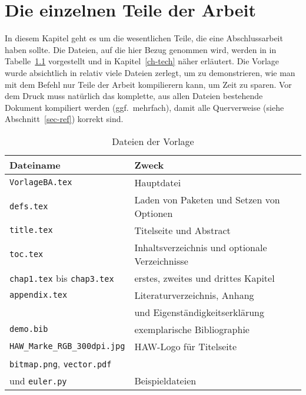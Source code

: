 \chapter{Die einzelnen Teile der Arbeit}


In diesem Kapitel geht es um die wesentlichen Teile, die eine Abschlussarbeit
haben sollte.  Die Dateien, auf die hier Bezug genommen wird, werden in in
Tabelle~\ref{tab-files} vorgestellt und in Kapitel~\ref{ch-tech} näher
erläutert.  Die Vorlage wurde absichtlich in relativ viele Dateien zerlegt,
um zu demonstrieren, wie man mit dem Befehl \verb|| nur Teile der
Arbeit kompilierern kann, um Zeit zu sparen.  Vor dem Druck muss natürlich das
komplette, aus allen Dateien bestehende Dokument kompiliert werden (ggf.\
mehrfach), damit alle Querverweise (siehe Abschnitt~\ref{sec-ref}) korrekt
sind.

\begin{table}[!ht]
  \caption{Dateien der Vorlage}
  \centering
  \begin{tabular}{ll}
    \toprule
    Dateiname & Zweck \\
    \midrule
    \texttt{VorlageBA.tex} & Hauptdatei \\
    \texttt{defs.tex} & Laden von Paketen und Setzen von Optionen \\
    \texttt{title.tex} & Titelseite und Abstract \\
    \texttt{toc.tex} & Inhaltsverzeichnis und optionale Verzeichnisse \\
    \texttt{chap1.tex} bis \texttt{chap3.tex} & erstes, zweites und drittes Kapitel \\
    \texttt{appendix.tex} & Literaturverzeichnis, Anhang \\
    & und Eigenständigkeitserklärung \\
    \texttt{demo.bib} & exemplarische Bibliographie \\[3pt]
    \verb|HAW_Marke_RGB_300dpi.jpg| & HAW-Logo für Titelseite \\[3pt]
    \texttt{bitmap.png}, \texttt{vector.pdf} & \\
    und \texttt{euler.py} & Beispieldateien \\
    \bottomrule
  \end{tabular}
  \label{tab-files}
\end{table}

